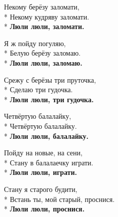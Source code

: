 \medskip

\begin{minipage}{\linewidth}
Некому берёзу заломати,\\*
Некому кудряву заломати.\\*
\textbf{Люли люли, заломати.}\\
\end{minipage}\par\medskip\nobreak

\medskip

\begin{minipage}{\linewidth}
Я ж пойду погуляю,\\*
Белую берёзу заломаю.\\*
\textbf{Люли люли, заломаю.}\\
\end{minipage}\par\medskip\nobreak

\medskip

\begin{minipage}{\linewidth}
Срежу с берёзы три пруточка,\\*
Сделаю три гудочка.\\*
\textbf{Люли люли, три гудочка.}\\
\end{minipage}\par\medskip\nobreak

\medskip

\begin{minipage}{\linewidth}
Четвёртую балалайку,\\*
Четвёртую балалайку.\\*
\textbf{Люли люли, балалайку.}\\
\end{minipage}\par\medskip\nobreak

\medskip

\begin{minipage}{\linewidth}
Пойду на новые, на сени,\\*
Стану в балалаечку играти.\\*
\textbf{Люли люли, играти.}\\
\end{minipage}\par\medskip\nobreak

\medskip

\begin{minipage}{\linewidth}
Стану я старого будити,\\*
Встань ты, мой старый, проснися.\\*
\textbf{Люли люли, проснися.}\\
\end{minipage}\par\medskip\nobreak

